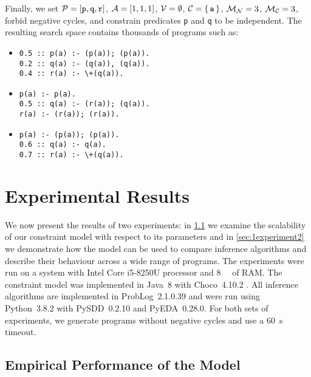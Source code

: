 Finally, we set $\mathcal{P}{} = [\texttt{p}, \texttt{q}, \texttt{r}]$,
$\mathcal{A}{} = [1, 1, 1]$, $\mathcal{V}{} = \emptyset$,
$\mathcal{C}{} = \{\, \texttt{a} \,\}$, $\mathcal{M}_{\mathcal{N}}{} = 3$,
$\mathcal{M}_{\mathcal{C}}{} = 3$, forbid negative cycles, and constrain predicates
\texttt{p} and \texttt{q} to be independent. The resulting search space contains
thousands of programs such as:

\begin{itemize}
\item
\begin{verbatim}
0.5 :: p(a) :- (p(a)); (p(a)).
0.2 :: q(a) :- (q(a)), (q(a)).
0.4 :: r(a) :- \+(q(a)).
\end{verbatim}
\item
\begin{verbatim}
p(a) :- p(a).
0.5 :: q(a) :- (r(a)); (q(a)).
r(a) :- (r(a)); (r(a)).
\end{verbatim}
\item
\begin{verbatim}
p(a) :- (p(a)); (p(a)).
0.6 :: q(a) :- q(a).
0.7 :: r(a) :- \+(q(a)).
\end{verbatim}
\end{itemize}

\section{Experimental Results}\label{sec:1experiments}

We now present the results of two experiments: in \cref{sec:1experiment1} we
examine the scalability of our constraint model with respect to its parameters
and in \cref{sec:1experiment2} we demonstrate how the model can be used to
compare inference algorithms and describe their behaviour across a wide range of
programs. The experiments were run on a system with Intel Core i5-8250U
processor and \SI{8}{\giga\byte} of RAM\@. The constraint model was implemented
in Java~8 with Choco~4.10.2 \citep{choco}. All inference algorithms are
implemented in ProbLog~2.1.0.39 and were run using Python~3.8.2 with
PySDD~0.2.10 and PyEDA~0.28.0. For both sets of experiments, we generate
programs without negative cycles and use a \SI{60}{\second} timeout.

\subsection{Empirical Performance of the Model}\label{sec:1experiment1}

